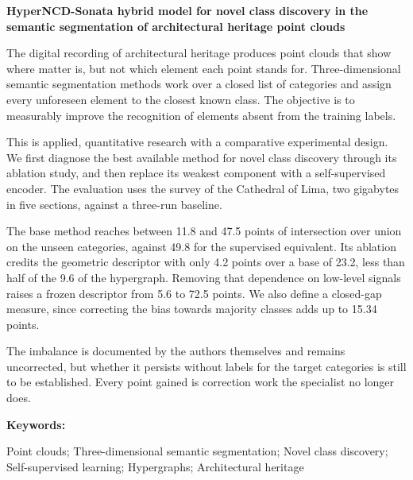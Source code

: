 
\begin{center}
\large \vspace{-1.5cm} \textbf{HyperNCD-Sonata hybrid model for novel class
discovery in the semantic segmentation of architectural heritage point clouds}
\end{center}

The digital recording of architectural heritage produces point clouds that show
where matter is, but not which element each point stands for. Three-dimensional
semantic segmentation methods work over a closed list of categories and assign
every unforeseen element to the closest known class. The objective is to
measurably improve the recognition of elements absent from the training labels.

This is applied, quantitative research with a comparative experimental design. We
first diagnose the best available method for novel class discovery through its
ablation study, and then replace its weakest component with a
self-supervised encoder. The evaluation uses the survey of the Cathedral of Lima,
two gigabytes in five sections, against a three-run baseline.

The base method reaches between 11.8 and 47.5 points of intersection over union
on the unseen categories, against 49.8 for the supervised equivalent. Its
ablation credits the geometric descriptor with only 4.2 points over a base of
23.2, less than half of the 9.6 of the hypergraph. Removing that dependence on
low-level signals raises a frozen descriptor from 5.6 to 72.5 points. We also
define a closed-gap measure, since correcting the bias towards majority classes
adds up to 15.34 points.

The imbalance is documented by the authors themselves and remains uncorrected,
but whether it persists without labels for the target categories is still to be
established. Every point gained is correction work the specialist no longer does.

\vspace{1em}

\noindent\begin{minipage}{\linewidth}
\noindent\textbf{Keywords:}\par
\noindent Point clouds; Three-dimensional semantic segmentation; Novel class
discovery; Self-supervised learning; Hypergraphs; Architectural heritage
\end{minipage}
